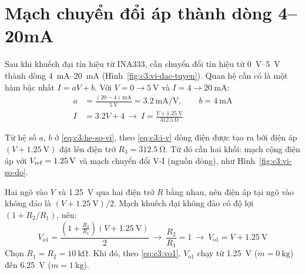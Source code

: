 

\section{Mạch chuyển đổi áp thành dòng 4--20mA}
\label{sec:c3:vi-converter}

Sau khi khuếch đại tín hiệu từ INA333, cần chuyển đổi tín hiệu từ \qtyrange{0}{5}{\volt} thành dòng
\qtyrange{4}{20}{\milli\ampere} (Hình~\ref{fig:c3:vi-dac-tuyen}). Quan hệ cần có là một hàm bậc nhất
$I = aV + b$. Với $V = 0 \rightarrow \qty{5}{\volt}$ và $I = 4 \rightarrow \qty{20}{\milli\ampere}$:
\begin{align}
    a &= \frac{(20 - 4)\,\unit{\milli\ampere}}{\qty{5}{\volt}} = \qty{3.2}{\milli\ampere\per\volt},
    \qquad b = \qty{4}{\milli\ampere} \label{eq:c3:he-so-vi} \\
    I &= 3.2V + 4 \ \rightarrow \ I = \frac{V + \qty{1.25}{\volt}}{\qty{312.5}{\ohm}} \label{eq:c3:i-v}
\end{align}


Từ hệ số $a$, $b$ ở \eqref{eq:c3:he-so-vi}, theo \eqref{eq:c3:i-v} dòng điện được tạo ra bởi điện áp $(V + \qty{1.25}{\volt})$ đặt lên điện trở
$R_3 = \qty{312.5}{\ohm}$. Từ đó cần hai khối: mạch cộng điện áp với $V_{\mathrm{ref}} = \qty{1.25}{\volt}$ và mạch
chuyển đổi V-I (nguồn dòng), như Hình~\ref{fig:c3:vi-so-do}.


Hai ngõ vào $V$ và \qty{1.25}{\volt} qua hai điện trở $R$ bằng nhau, nên điện áp tại ngõ vào không đảo là
$(V + \qty{1.25}{\volt})/2$. Mạch khuếch đại không đảo có độ lợi $(1 + R_2/R_1)$, nên:
\begin{equation}
    V_{\mathrm{o1}} = \frac{\left(1 + \frac{R_2}{R_1}\right)(V + \qty{1.25}{\volt})}{2}
    \ \rightarrow \ \frac{R_2}{R_1} = 1 \ \rightarrow \ V_{\mathrm{o1}} = V + \qty{1.25}{\volt}
    \label{eq:c3:vo1}
\end{equation}
Chọn $R_1 = R_2 = \qty{10}{\kilo\ohm}$. Khi đó, theo \eqref{eq:c3:vo1}, $V_{\mathrm{o1}}$ chạy từ \qty{1.25}{\volt}
($m = \qty{0}{\kilo\gram}$) đến \qty{6.25}{\volt} ($m = \qty{1}{\kilo\gram}$).

